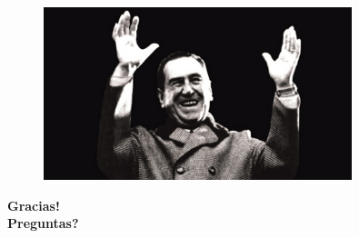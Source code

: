 \documentclass[xcolor={dvipsnames}]{beamer}
\begin{document}
\begin{frame}
	\vspace{-0.8cm}
	\begin{center}
		\begin{figure}
		\includegraphics[width = 0.8\textwidth]{./assets/peron1.jpg}
		\end{figure}
		\Large{\textbf{Gracias! \\ Preguntas?}}
	\end{center}
\end{frame}
\end{document}

